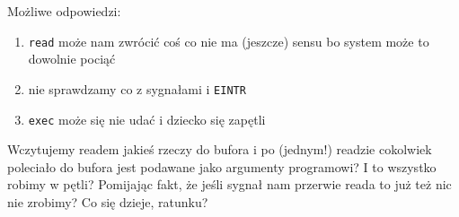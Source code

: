 Możliwe odpowiedzi:
\begin{enumerate}
	\item \texttt{read} może nam zwrócić coś co nie ma (jeszcze) sensu bo system może to dowolnie pociąć
	\item nie sprawdzamy co z sygnałami i \texttt{EINTR}
	\item \texttt{exec} może się nie udać i dziecko się zapętli
\end{enumerate}

Wczytujemy readem jakieś rzeczy do bufora i po (jednym!) readzie cokolwiek poleciało do bufora jest podawane jako argumenty programowi? I to wszystko robimy w pętli? Pomijając fakt, że jeśli sygnał nam przerwie reada to już też nic nie zrobimy? Co się dzieje, ratunku?

